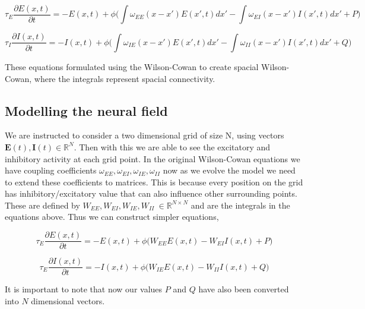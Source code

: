 \documentclass[10pt]{article}
\begin{document}
\begin{flushleft}
\begin{equation}
    \tau_E\frac{\partial E(x,t)}{\partial t} = -E(x,t) + \phi  \bigg( \int \omega_{EE}(x - x')E(x',t)dx' - \int\omega_{EI}(x-x')I(x',t)dx' +P \bigg)
\end{equation}

\begin{equation}
    \tau_I\frac{\partial I(x,t)}{\partial t} = -I(x,t) + \phi  \bigg( \int \omega_{IE}(x - x')E(x',t)dx' - \int\omega_{II}(x-x')I(x',t)dx' +Q \bigg)
\end{equation}

\begin{flushleft}
    These equations formulated using the Wilson-Cowan to create spacial Wilson-Cowan, where the integrals represent spacial connectivity. 
\end{flushleft}


\subsection{Modelling the neural field}

\begin{flushleft}
We are instructed to consider a two dimensional grid of size N, using vectors $\mathbf{E}(t),\mathbf{I}(t) \in \mathbb{R}^{N}$. Then with this we are able to see the excitatory and inhibitory activity at each grid point. In  the original Wilson-Cowan equations we have coupling coefficients $\omega_{EE},\omega_{EI},\omega_{IE},\omega_{II}$ now as we evolve the model we need to extend these coefficients to matrices. This is because every position on the grid has inhibitory/excitatory value that can also influence other surrounding points. These are defined by 
$W_{EE},W_{EI},W_{IE},W_{II} \ \in \mathbb{R}^{N \times N}$ and are the integrals in the equations above. Thus we can construct simpler equations,
\end{flushleft}

\begin{equation}
    \tau_E\frac{\partial E(x,t)}{\partial t} = -E(x,t) + \phi  \bigg( W_{EE}E(x,t) - W_{EI}I(x,t) + P \bigg)
\end{equation}

\begin{equation}
    \tau_E\frac{\partial I(x,t)}{\partial t} = -I(x,t) + \phi  \bigg( W_{IE}E(x,t) - W_{II}I(x,t) + Q \bigg)
\end{equation}

It is important to note that now our values $P$ and $Q$ have also been converted into $N$ dimensional vectors.


\end{flushleft}
\end{document}
